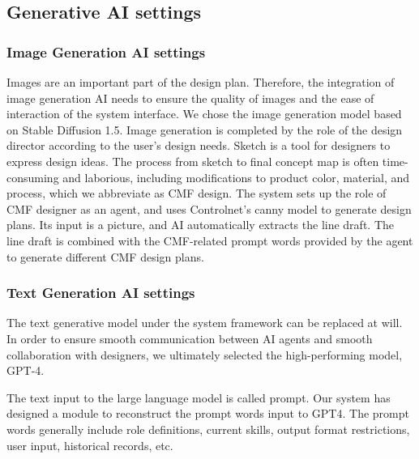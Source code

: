 \documentclass[10pt, conference, compsocconf]{IEEEtran}
\begin{document}



\subsection{Generative AI settings}
\subsubsection{Image Generation AI settings}
Images are an important part of the design plan. Therefore, the integration of image generation AI needs to ensure the quality of images and the ease of interaction of the system interface. We chose the image generation model based on Stable Diffusion 1.5. Image generation is completed by the role of the design director according to the user's design needs. Sketch is a tool for designers to express design ideas. The process from sketch to final concept map is often time-consuming and laborious, including modifications to product color, material, and process, which we abbreviate as CMF design. The system sets up the role of CMF designer as an agent, and uses Controlnet's canny model to generate design plans. Its input is a picture, and AI automatically extracts the line draft. The line draft is combined with the CMF-related prompt words provided by the agent to generate different CMF design plans.

\subsubsection{Text Generation AI settings}
The text generative model under the system framework can be replaced at will. In order to ensure smooth communication between AI agents and smooth collaboration with designers, we ultimately selected the high-performing model, GPT-4.

The text input to the large language model is called prompt. Our system has designed a module to reconstruct the prompt words input to GPT4. The prompt words generally include role definitions, current skills, output format restrictions, user input, historical records, etc.
\end{document}
